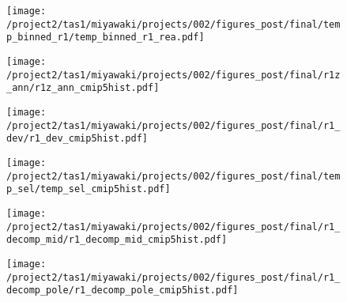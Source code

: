 \documentclass{ametsocV5}
\begin{document}
\begin{figure}[t]
  \noindent\texttt{[image: /project2/tas1/miyawaki/projects/002/figures\_post/final/temp\_binned\_r1/temp\_binned\_r1\_rea.pdf]}\\
  \label{fig:cmip5-binned-r1}
\end{figure}

\begin{figure}[t]
  \noindent\texttt{[image: /project2/tas1/miyawaki/projects/002/figures\_post/final/r1z\_ann/r1z\_ann\_cmip5hist.pdf]}\\
  \label{fig:cmip5hist-r1-ann}
\end{figure}

\begin{figure}[t]
  \noindent\texttt{[image: /project2/tas1/miyawaki/projects/002/figures\_post/final/r1\_dev/r1\_dev\_cmip5hist.pdf]}\\
  \label{fig:cmip5hist-r1-dev}
\end{figure}

\begin{figure}[t]
  \noindent\texttt{[image: /project2/tas1/miyawaki/projects/002/figures\_post/final/temp\_sel/temp\_sel\_cmip5hist.pdf]}\\
  \label{fig:cmip5hist-temp-sel}
\end{figure}

\begin{figure}[t]
  \noindent\texttt{[image: /project2/tas1/miyawaki/projects/002/figures\_post/final/r1\_decomp\_mid/r1\_decomp\_mid\_cmip5hist.pdf]}\\
  \label{fig:cmip5hist-r1-decomp-mid}
\end{figure}

\begin{figure}[t]
  \noindent\texttt{[image: /project2/tas1/miyawaki/projects/002/figures\_post/final/r1\_decomp\_pole/r1\_decomp\_pole\_cmip5hist.pdf]}\\
  \label{fig:cmip5hist-r1-decomp-pole}
\end{figure}
\end{document}
